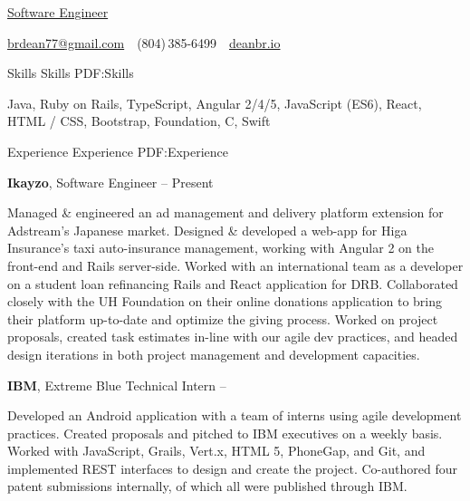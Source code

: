 \documentclass[letterpaper,MMMyyyy,nonstopmode]{simpleresumecv}
\newcommand{\CVAuthor}{Brandon Dean}
\newcommand{\CVWebpage}{deanbr.io}
\begin{document}

\Title{\CVAuthor}

\begin{SubTitle}
\href{https://www.google.com/maps/place/17+Prime+Avenue,+Springfield,+Pennsylvania+10111,+USA}
{Software Engineer}
\par
\href{mailto:brdean77@gmail.com}
{brdean77@gmail.com}
\,\SubBulletSymbol\,
(804)\,385-6499
\,\SubBulletSymbol\,
\href{\CVWebpage}
{\url{\CVWebpage}}
\end{SubTitle}

\begin{Body}


\Section
{Skills}
{Skills}
{PDF:Skills}

\Entry
Java,
Ruby on Rails,
TypeScript,
Angular 2/4/5,
JavaScript (ES6),
React,
HTML / CSS,
Bootstrap,
Foundation,
C,
Swift



\Section
{Experience}
{Experience}
{PDF:Experience}

\Entry
{\textbf{Ikayzo}},
Software Engineer
\hfill
{} --
Present

\Gap
\BulletItem
Managed \& engineered an ad management and delivery platform extension for Adstream's Japanese market.
\BulletItem
Designed \& developed a web-app for Higa Insurance's taxi auto-insurance management, working with Angular 2 on the front-end and Rails server-side.
\BulletItem
Worked with an international team as a developer on a student loan refinancing Rails and React application for DRB.
\BulletItem
Collaborated closely with the UH Foundation on their online donations application to bring their platform up-to-date and optimize the giving process.
\BulletItem
Worked on project proposals, created task estimates in-line with our agile dev practices, and headed design iterations in both project management and development capacities.

\BigGap
\Entry
{\textbf{IBM}},
Extreme Blue Technical Intern
\hfill
{} --

\Gap
\BulletItem
Developed an Android application with a team of interns using agile development practices.
\BulletItem
Created proposals and pitched to IBM executives on a weekly basis.
\BulletItem
Worked with JavaScript, Grails, Vert.x, HTML 5, PhoneGap, and Git, and implemented REST interfaces to design and create the project.
\BulletItem
Co-authored four patent submissions internally, of which all were published through IBM.


\end{Body}
\end{document}

